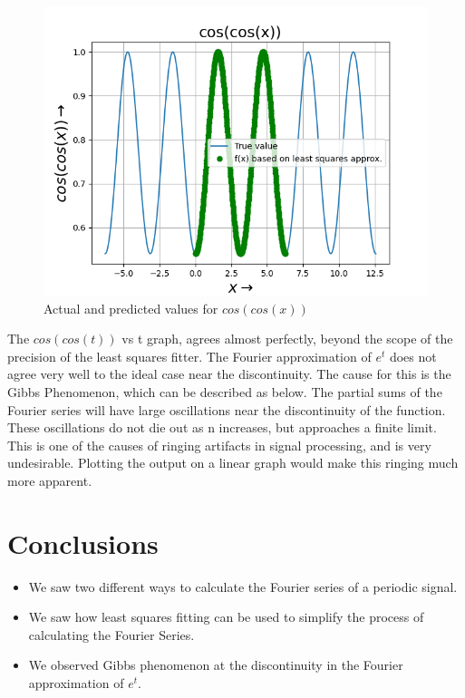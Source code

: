 \documentclass[11pt, a4paper]{article}
\begin{document}
   \begin{figure}[!tbh]
   	\centering
   	\includegraphics[scale=0.6]{Figure_2.png}   
   	\caption{Actual and predicted values for $cos(cos(x))$}
   	\label{fig:sample}
   \end{figure} 
   The $cos(cos(t))$ vs t graph, agrees almost perfectly, beyond the scope of the precision of the least squares fitter.
The Fourier approximation of $e^{t}$ does not agree very well to the ideal case near the discontinuity. The cause for this is the Gibbs Phenomenon, which can be described as below.
The partial sums of the Fourier series will have large oscillations near the discontinuity of the function. These oscillations do not die out as n increases, but approaches a finite limit.
This is one of the causes of ringing artifacts in signal processing, and is very undesirable.
Plotting the output on a linear graph would make this ringing much more apparent.
	
\section*{Conclusions}
\begin{itemize}
\item We saw two different ways to calculate the Fourier series of a periodic signal.
\item We saw how least squares fitting can be used to simplify the process of calculating the Fourier Series.
\item We observed Gibbs phenomenon at the discontinuity in the Fourier approximation of $e^{t}$.
\end{itemize}
\end{document}
